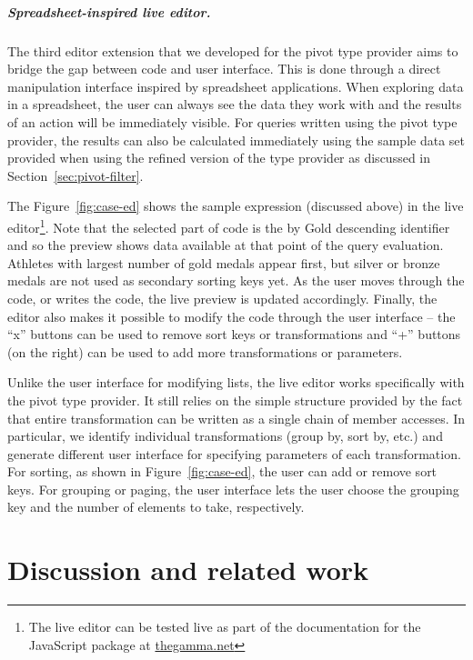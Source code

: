 \documentclass[a4paper,UKenglish]{lipics-v2016}
\theoremstyle{plain}
\theoremstyle{definition}
\newcommand{\qident}[1]{\textnormal{\sffamily \guillemotleft #1\guillemotright}}
\begin{document}

\subparagraph{Spreadsheet-inspired live editor.}
The third editor extension that we developed for the pivot type provider aims to bridge the gap 
between code and user interface. This is done through a direct manipulation interface \cite{directman} 
inspired by spreadsheet applications. When exploring data in a spreadsheet, the user can always see the 
data they work with and the results of an action will be immediately visible. For queries written
using the pivot type provider, the results can also be calculated immediately using the sample 
data set provided when using the refined version of the type provider as discussed in 
Section~\ref{sec:pivot-filter}. 

The Figure~\ref{fig:case-ed} shows the sample expression (discussed above) in the live 
editor\footnote{The live editor can be tested live as part of the documentation for the 
JavaScript package at \url{thegamma.net}}.
Note that the selected part of code is the \qident{by Gold descending} identifier and so the 
preview shows data available at that point of the query evaluation. Athletes with largest number
of gold medals appear first, but silver or bronze medals are not used as secondary sorting keys yet.
As the user moves through the code, or writes the code, the live preview is updated accordingly.
Finally, the editor also makes it possible to modify the code through the user interface -- the
``x'' buttons can be used to remove sort keys or transformations and ``+'' buttons (on the right)
can be used to add more transformations or parameters.

Unlike the user interface for modifying lists, the live editor works specifically with the pivot 
type provider. It still relies on the simple structure provided by the fact that entire 
transformation can be written as a single chain of member accesses. In particular,
we identify individual transformations (\qident{group by}, \qident{sort by}, etc.) and 
generate different user interface for specifying parameters of each transformation. For sorting, as 
shown in Figure~\ref{fig:case-ed}, the user can add or remove sort keys. For grouping 
or paging, the user interface lets the user choose the grouping key and the number of 
elements to take, respectively.


\section{Discussion and related work}
\end{document}
